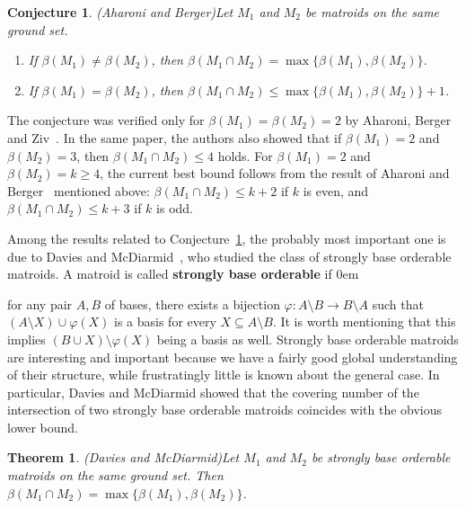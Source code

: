 \documentclass[11pt,a4paper]{article}
\newenvironment{symenum}
 {\enumerate[label=(\noexpand\thisenumsymbol),align=parleft,labelindent=0pt,itemindent=0pt,labelsep=35pt,leftmargin=*]}
 {\endenumerate}
\newcommand\thisenumsymbol{}
\newcommand\itemsymbol[1]{%
  \renewcommand{\thisenumsymbol}{#1}%
  \item
}
\theoremstyle{plain}
\newtheorem{thm}{Theorem}
\newtheorem{conj}{Conjecture}
\theoremstyle{definition}
\begin{document}
\begin{conj}{\normalfont(Aharoni and Berger)}\label{conj:ab}
Let $M_1$ and $M_2$ be matroids on the same ground set.
\begin{enumerate}[label={(\arabic*)}]\itemsep0em
    \item If $\beta(M_1)\neq \beta(M_2)$, then $\beta(M_1\cap M_2)=\max\{\beta(M_1),\beta(M_2)\}$.
    \item If $\beta(M_1)= \beta(M_2)$, then $\beta(M_1\cap M_2)\leq \max\{\beta(M_1),\beta(M_2)\}+1$.
\end{enumerate} 
\end{conj}
The conjecture was verified only for $\beta(M_1)=\beta(M_2)=2$ by Aharoni, Berger and Ziv~\cite{aharoni2012edge}. In the same paper, the authors also showed that if $\beta(M_1)=2$ and $\beta(M_2) = 3$, then $\beta(M_1 \cap M_2) \le 4$ holds. For $\beta(M_1)=2$ and $\beta(M_2) = k \ge 4$, the current best bound follows from the result of Aharoni and Berger~\cite{aharoni2006intersection} mentioned above: $\beta(M_1 \cap M_2) \le k+2$ if $k$ is even, and $\beta(M_1 \cap M_2) \le k+3$ if $k$ is odd.   

Among the results related to Conjecture~\ref{conj:ab}, the probably most important one is due to Davies and McDiarmid~\cite{davies1976disjoint}, who studied the class of strongly base orderable matroids. A matroid is called \textbf{strongly base orderable} if
\begin{symenum}
\itemsep0em
    \itemsymbol{SBO}\label{prop:sbo} for any pair $A,B$ of bases, there exists a bijection $\varphi\colon A\setminus B \to B\setminus A$ such that $(A\setminus X)\cup \varphi(X)$ is a basis for every $X\subseteq A\setminus B$.
\end{symenum}
It is worth mentioning that this implies $(B\cup X)\setminus \varphi(X)$ being a basis as well. Strongly base orderable matroids are interesting and important because we have a fairly good global understanding of their structure, while frustratingly little is known about the general case. In particular, Davies and McDiarmid showed that the covering number of the intersection of two strongly base orderable matroids coincides with the obvious lower bound.

\begin{thm}{\normalfont(Davies and McDiarmid)}\label{thm:dm} 
Let $M_1$ and $M_2$ be strongly base orderable matroids on the same ground set. Then $\beta(M_1\cap M_2) = \max\{\beta(M_1), \beta(M_2)\}$.
\end{thm}
\end{document}
